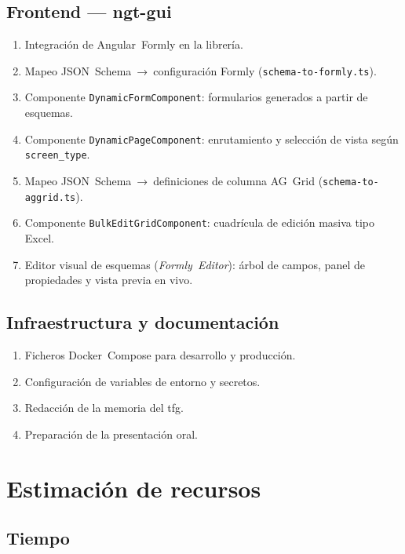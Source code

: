\subsection{Frontend — ngt-gui}
\label{subsec:wbs-frontend}

\begin{enumerate}[label=F\arabic*.]
  \item Integración de Angular~Formly en la librería.
  \item Mapeo JSON~Schema~→~configuración Formly (\texttt{schema-to-formly.ts}).
  \item Componente \texttt{DynamicFormComponent}: formularios generados a partir de
    esquemas.
  \item Componente \texttt{DynamicPageComponent}: enrutamiento y selección de vista
    según \texttt{screen\_type}.
  \item Mapeo JSON~Schema~→~definiciones de columna AG~Grid
    (\texttt{schema-to-aggrid.ts}).
  \item Componente \texttt{BulkEditGridComponent}: cuadrícula de edición masiva tipo
    Excel.
  \item Editor visual de esquemas (\textit{Formly~Editor}): árbol de campos, panel de
    propiedades y vista previa en vivo.
\end{enumerate}

\subsection{Infraestructura y documentación}
\label{subsec:wbs-infra}

\begin{enumerate}[label=I\arabic*.]
  \item Ficheros Docker~Compose para desarrollo y producción.
  \item Configuración de variables de entorno y secretos.
  \item Redacción de la memoria del \gls{tfg}.
  \item Preparación de la presentación oral.
\end{enumerate}

\section{Estimación de recursos}
\label{sec:recursos}

\subsection{Tiempo}
\label{subsec:tiempo}


